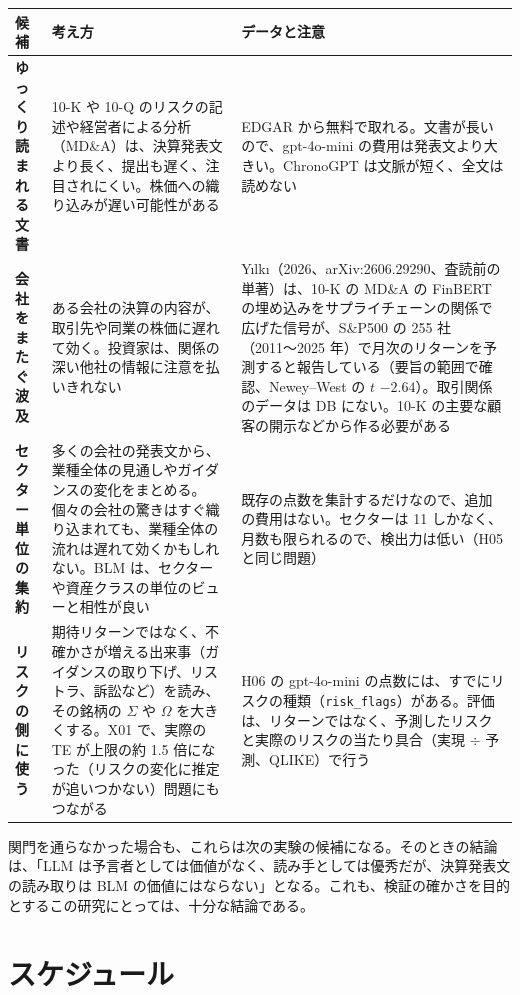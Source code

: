 \documentclass[xelatex,ja=standard,jafont=haranoaji,a4paper,10pt]{bxjsreport}
\newcommand{\SP}{S\&P500}
\newcommand{\code}[1]{\texttt{#1}}
\begin{document}
\begin{longtable}{p{2.7cm}p{6.0cm}p{5.4cm}}
\toprule
\textbf{候補} & \textbf{考え方} & \textbf{データと注意} \\
\midrule
\endfirsthead
\bottomrule
\endfoot
\textbf{ゆっくり読まれる文書} & 10-K や 10-Q のリスクの記述や経営者による分析（MD\&A）は、決算発表文より長く、提出も遅く、注目されにくい。株価への織り込みが遅い可能性がある & EDGAR から無料で取れる。文書が長いので、gpt-4o-mini の費用は発表文より大きい。ChronoGPT は文脈が短く、全文は読めない \\
\midrule
\textbf{会社をまたぐ波及} & ある会社の決算の内容が、取引先や同業の株価に遅れて効く。投資家は、関係の深い他社の情報に注意を払いきれない & Yılkı（2026、arXiv:2606.29290、査読前の単著）は、10-K の MD\&A の FinBERT の埋め込みをサプライチェーンの関係で広げた信号が、\SP{} の 255 社（2011〜2025 年）で月次のリターンを予測すると報告している（要旨の範囲で確認、Newey--West の $t$ $-2.64$）。取引関係のデータは DB にない。10-K の主要な顧客の開示などから作る必要がある \\
\midrule
\textbf{セクター単位の集約} & 多くの会社の発表文から、業種全体の見通しやガイダンスの変化をまとめる。個々の会社の驚きはすぐ織り込まれても、業種全体の流れは遅れて効くかもしれない。BLM は、セクターや資産クラスの単位のビューと相性が良い & 既存の点数を集計するだけなので、追加の費用はない。セクターは 11 しかなく、月数も限られるので、検出力は低い（H05 と同じ問題） \\
\midrule
\textbf{リスクの側に使う} & 期待リターンではなく、不確かさが増える出来事（ガイダンスの取り下げ、リストラ、訴訟など）を読み、その銘柄の $\Sigma$ や $\Omega$ を大きくする。X01 で、実際の TE が上限の約 1.5 倍になった（リスクの変化に推定が追いつかない）問題にもつながる & H06 の gpt-4o-mini の点数には、すでにリスクの種類（\code{risk\_flags}）がある。評価は、リターンではなく、予測したリスクと実際のリスクの当たり具合（実現 $\div$ 予測、QLIKE）で行う \\
\end{longtable}

関門を通らなかった場合も、これらは次の実験の候補になる。そのときの結論は、「LLM は予言者としては価値がなく、読み手としては優秀だが、決算発表文の読み取りは BLM の価値にはならない」となる。これも、検証の確かさを目的とするこの研究にとっては、十分な結論である。

\section{スケジュール}
\end{document}
